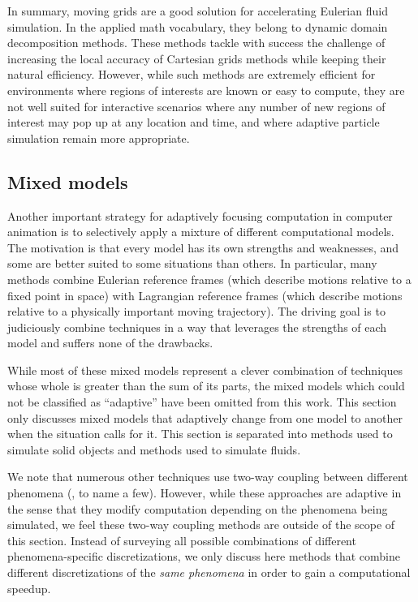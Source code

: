In summary, moving grids are a good solution for accelerating Eulerian fluid simulation. In the applied math vocabulary, they belong to dynamic domain decomposition methods.
These methods tackle with success the challenge of increasing the local accuracy of Cartesian grids methods while keeping their natural efficiency. However, while such methods are extremely efficient for environments where regions of interests are known or easy to compute, they are not well suited for interactive scenarios where any number of new regions of interest may pop up at any location and time, and where adaptive particle simulation remain more appropriate.

\subsection{Mixed models}
\label{sec:mixed-models}

Another important strategy for adaptively focusing computation in computer animation is to selectively apply a mixture of different computational models. The motivation is that every model has its own strengths and weaknesses, and some are better suited to some situations than others. In particular, many methods combine Eulerian reference frames (which describe motions relative to a fixed point in space) with Lagrangian reference frames (which describe motions relative to a physically important moving trajectory). The driving goal is to judiciously combine techniques in a way that leverages the strengths of each model and suffers none of the drawbacks.

While most of these mixed models represent a clever combination of techniques whose whole is greater than the sum of its parts, the mixed models which could not be classified as ``adaptive'' have been omitted from this work. This section only discusses mixed models that adaptively change from one model to another when the situation calls for it.
This section is separated into methods used to simulate solid objects and methods used to simulate fluids.

We note that numerous other techniques use two-way coupling between different phenomena (\hspace{1sp}\cite{carlson2004rigid,robinson2008two,shinar2008two,Remillard2013}, to name a few). However, while these approaches are adaptive in the sense that they modify computation depending on the phenomena being simulated, we feel these two-way coupling methods are outside of the scope of this section. Instead of surveying all possible combinations of different phenomena-specific discretizations, we only discuss here methods that combine different discretizations of the {\em same phenomena} in order to gain a computational speedup.


